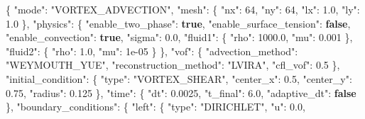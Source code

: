\documentclass[
  10pt,
]{article}
\newenvironment{Shaded}{}{}
\newcommand{\DataTypeTok}[1]{\textcolor[rgb]{0.56,0.13,0.00}{#1}}
\newcommand{\DecValTok}[1]{\textcolor[rgb]{0.25,0.63,0.44}{#1}}
\newcommand{\FloatTok}[1]{\textcolor[rgb]{0.25,0.63,0.44}{#1}}
\newcommand{\FunctionTok}[1]{\textcolor[rgb]{0.02,0.16,0.49}{#1}}
\newcommand{\KeywordTok}[1]{\textcolor[rgb]{0.00,0.44,0.13}{\textbf{#1}}}
\newcommand{\StringTok}[1]{\textcolor[rgb]{0.25,0.44,0.63}{#1}}
\begin{document}
\begin{Shaded}
\begin{Highlighting}[]
\FunctionTok{\{}
  \DataTypeTok{"mode"}\FunctionTok{:} \StringTok{"VORTEX\_ADVECTION"}\FunctionTok{,}
  \DataTypeTok{"mesh"}\FunctionTok{:} \FunctionTok{\{}
    \DataTypeTok{"nx"}\FunctionTok{:} \DecValTok{64}\FunctionTok{,}
    \DataTypeTok{"ny"}\FunctionTok{:} \DecValTok{64}\FunctionTok{,}
    \DataTypeTok{"lx"}\FunctionTok{:} \FloatTok{1.0}\FunctionTok{,}
    \DataTypeTok{"ly"}\FunctionTok{:} \FloatTok{1.0}
  \FunctionTok{\},}
  \DataTypeTok{"physics"}\FunctionTok{:} \FunctionTok{\{}
    \DataTypeTok{"enable\_two\_phase"}\FunctionTok{:} \KeywordTok{true}\FunctionTok{,}
    \DataTypeTok{"enable\_surface\_tension"}\FunctionTok{:} \KeywordTok{false}\FunctionTok{,}
    \DataTypeTok{"enable\_convection"}\FunctionTok{:} \KeywordTok{true}\FunctionTok{,}
    \DataTypeTok{"sigma"}\FunctionTok{:} \FloatTok{0.0}\FunctionTok{,}
    \DataTypeTok{"fluid1"}\FunctionTok{:} \FunctionTok{\{}
      \DataTypeTok{"rho"}\FunctionTok{:} \FloatTok{1000.0}\FunctionTok{,}
      \DataTypeTok{"mu"}\FunctionTok{:} \FloatTok{0.001}
    \FunctionTok{\},}
    \DataTypeTok{"fluid2"}\FunctionTok{:} \FunctionTok{\{}
      \DataTypeTok{"rho"}\FunctionTok{:} \FloatTok{1.0}\FunctionTok{,}
      \DataTypeTok{"mu"}\FunctionTok{:} \DecValTok{1e{-}05}
    \FunctionTok{\}}
  \FunctionTok{\},}
  \DataTypeTok{"vof"}\FunctionTok{:} \FunctionTok{\{}
    \DataTypeTok{"advection\_method"}\FunctionTok{:} \StringTok{"WEYMOUTH\_YUE"}\FunctionTok{,}
    \DataTypeTok{"reconstruction\_method"}\FunctionTok{:} \StringTok{"LVIRA"}\FunctionTok{,}
    \DataTypeTok{"cfl\_vof"}\FunctionTok{:} \FloatTok{0.5}
  \FunctionTok{\},}
  \DataTypeTok{"initial\_condition"}\FunctionTok{:} \FunctionTok{\{}
    \DataTypeTok{"type"}\FunctionTok{:} \StringTok{"VORTEX\_SHEAR"}\FunctionTok{,}
    \DataTypeTok{"center\_x"}\FunctionTok{:} \FloatTok{0.5}\FunctionTok{,}
    \DataTypeTok{"center\_y"}\FunctionTok{:} \FloatTok{0.75}\FunctionTok{,}
    \DataTypeTok{"radius"}\FunctionTok{:} \FloatTok{0.125}
  \FunctionTok{\},}
  \DataTypeTok{"time"}\FunctionTok{:} \FunctionTok{\{}
    \DataTypeTok{"dt"}\FunctionTok{:} \FloatTok{0.0025}\FunctionTok{,}
    \DataTypeTok{"t\_final"}\FunctionTok{:} \FloatTok{6.0}\FunctionTok{,}
    \DataTypeTok{"adaptive\_dt"}\FunctionTok{:} \KeywordTok{false}
  \FunctionTok{\},}
  \DataTypeTok{"boundary\_conditions"}\FunctionTok{:} \FunctionTok{\{}
    \DataTypeTok{"left"}\FunctionTok{:} \FunctionTok{\{}
      \DataTypeTok{"type"}\FunctionTok{:} \StringTok{"DIRICHLET"}\FunctionTok{,}
      \DataTypeTok{"u"}\FunctionTok{:} \FloatTok{0.0}\FunctionTok{,}

\end{Highlighting}
\end{Shaded}
\end{document}
